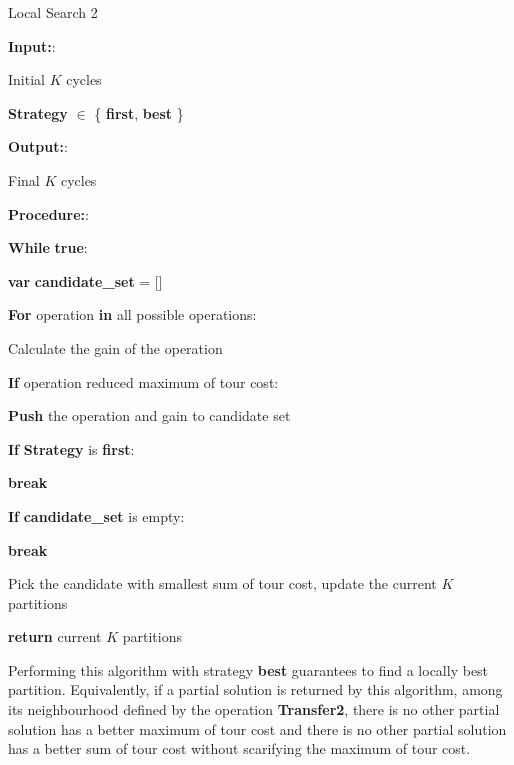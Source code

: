 \begin{algorithm}[H]
\caption{Local Search 2}
\label{algo:localsearch2}
\textbf{Input:}:

    Initial $K$ cycles
    
    \textbf{Strategy} $\in$ \{ \textbf{first}, \textbf{best} \} 

\textbf{Output:}:

    Final $K$ cycles
    
\textbf{Procedure:}:

\textbf{While} \textbf{true}:

    \hspace{1cm} \textbf{var} \textbf{candidate\_set} = []

    \hspace{1cm} \textbf{For} operation \textbf{in} all possible operations:
    
        \hspace{2cm} Calculate the gain of the operation
            
        \hspace{2cm} \textbf{If} operation reduced maximum of tour cost:
            
            \hspace{3cm} \textbf{Push} the operation and gain to candidate set
                
            \hspace{3cm} \textbf{If} \textbf{Strategy} is \textbf{first}:
                
                \hspace{4cm} \textbf{break}
                
    \hspace{1cm} \textbf{If} \textbf{candidate\_set} is empty:
    
        \hspace{2cm} \textbf{break}
    
    \hspace{1cm} Pick the candidate with smallest sum of tour cost, update the current $K$ partitions
    
\textbf{return} current $K$ partitions

\end{algorithm}

Performing this algorithm with strategy \textbf{best} guarantees to find a locally best partition. Equivalently, if a partial solution is returned by this algorithm, among its neighbourhood defined by the operation \textbf{Transfer2}, there is no other partial solution has a better maximum of tour cost and there is no other partial solution has a better sum of tour cost without scarifying the maximum of tour cost.


